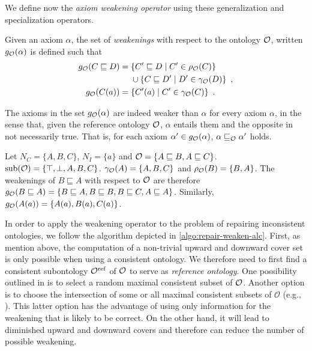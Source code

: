We define now the \emph{axiom weakening operator} using these generalization and specialization operators.

\begin{definition}
  Given an axiom $\alpha$, the set of \emph{weakenings} with respect to the ontology $\mathcal{O}$, written $g_\mathcal{O}(\alpha)$ is defined such that
  \begin{align*}
    g_\mathcal{O}(C \sqsubseteq D) ={} & \{ C' \sqsubseteq D \mid C' \in \rho_\mathcal{O} (C) \} \\
    & \cup \{ C \sqsubseteq D' \mid D' \in \gamma_\mathcal{O}(D) \} \enspace, \\
    g_\mathcal{O}(C(a)) ={} & \{ C'(a) \mid C' \in \gamma_\mathcal{O}(C) \} \enspace.
  \end{align*}
\end{definition}

The axioms in the set $g_\mathcal{O}(\alpha)$ are indeed weaker than $\alpha$ for every axiom $\alpha$, in the sense that, given the reference ontology $\mathcal{O}$, $\alpha$ entails them and the opposite in not necessarily true. That is, for each axiom $\alpha' \in g_\mathcal{O}(\alpha)$, $\alpha \sqsubseteq_\mathcal{O} \alpha'$ holds.

\begin{example}
  Let $N_C = \{ A, B, C \}$, $N_I = \{ a \}$ and $\mathcal{O} = \{ A \sqsubseteq B, A \sqsubseteq C \}$. ${\operatorname{sub}}(\mathcal{O}) = \{\top, \bot, A, B, C\}$. $\gamma_\mathcal{O}(A) = \{ A, B, C \}$ and $\rho_\mathcal{O}(B) = \{ B, A \}$. The weakenings of $B \sqsubseteq A$ with respect to $\mathcal{O}$ are therefore $g_\mathcal{O}(B \sqsubseteq A) = \{ B \sqsubseteq A, B \sqsubseteq B, B \sqsubseteq C, A \sqsubseteq A \}$. Similarly, $g_\mathcal{O}(A(a)) = \{ A(a), B(a), C(a) \}$.
\end{example}

In order to apply the weakening operator to the problem of repairing inconsistent ontologies, we follow the algorithm depicted in \cref{algo:repair-weaken-alc}. First, as mention above, the computation of a non-trivial upward and downward cover set is only possible when using a consistent ontology. We therefore need to first find a consistent subontology ${\mathcal{O}^\textnormal{ref}}$ of $\mathcal{O}$ to serve as \emph{reference ontology}. One possibility outlined in \cite{troquard2018repairing} is to select a random maximal consistent subset of $\mathcal{O}$. Another option is to choose the intersection of some or all maximal consistent subsets of $\mathcal{O}$ (e.g., \cite{LLRRS10}). This latter option has the advantage of using only information for the weakening that is likely to be correct. On the other hand, it will lead to diminished upward and downward covers and therefore can reduce the number of possible weakening.

